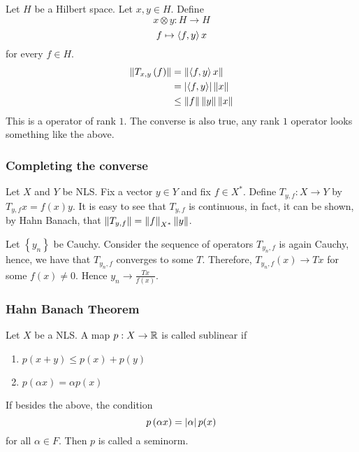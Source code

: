 Let $H$ be a Hilbert space. Let $x,y \in H$. Define
\begin{equation*}
    x \otimes y : H \to H
\end{equation*}
\begin{equation*}
    f \mapsto \left\langle f,y \right\rangle x 
\end{equation*}
for every $f\in H$.
\begin{align*}
    \left\lVert T_{x,y} \left( f \right) \right\rVert &= \left\lVert \left\langle f,y \right\rangle x \right\rVert \\
    &= \left\lvert \left\langle f,y \right\rangle \right\rvert\left\lVert x \right\rVert \\
&\le \left\lVert f \right\rVert \left\lVert y \right\rVert \left\lVert x \right\rVert
\end{align*}
This is a operator of rank $1$. The converse is also true, any rank $1$ operator looks something like the above.

\subsubsection{Completing the converse}

Let $X$ and $Y$ be NLS. Fix a vector $y \in Y$ and fix $f\in X^{*}$. Define $T_{y,f} : X \to Y$ by $T_{y,f} x = f(x)y$. It is easy to see that $T_{y,f}$ is continuous, in fact, it can be shown, by Hahn Banach, that $\left\lVert T_{y,f} \right\rVert =\left\lVert f \right\rVert_{X^{*}} \left\lVert y \right\rVert$.

Let $\left\{ y_{n} \right\}$ be Cauchy. Consider the sequence of operators $T_{y_{n}, f}$ is again Cauchy, hence, we have that $T_{y_{n},f}$ converges to some $T$. Therefore, $T_{y_{n}, f} (x) \to Tx$ for some $f(x) \ne 0$. Hence $y_{n} \to \frac{Tx}{f\left( x \right)}$.

\subsubsection{Hahn Banach Theorem}

Let $X$ be a NLS. A map $p : X \to \mathbb R$ is called sublinear if
\begin{enumerate}
    \item $p\left( x+y \right) \le p\left( x \right) + p \left( y \right)$
    \item $p\left( \alpha x \right) = \alpha p\left( x \right)$
\end{enumerate}
If besides the above, the condition
\begin{equation*}
    p\left( \alpha x \right) = \left\lvert \alpha \right\rvert p(x)
\end{equation*}
for all $\alpha\in F$. Then $p$ is called a seminorm.

